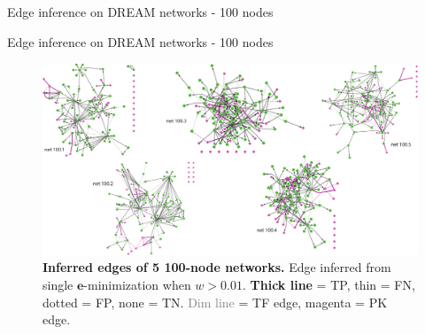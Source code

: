 \begin{frame}{Edge inference on DREAM networks - 100 nodes}
\end{frame}

\begin{frame}{Edge inference on DREAM networks - 100 nodes}
\begin{figure}[ht]
    \centering
    \includegraphics[width=.93\textwidth]{analysis/fig/dream100_infer_pres.pdf}
    \caption{\textbf{Inferred edges of 5 100-node networks.} Edge inferred from single $\boldsymbol{e}$-minimization when $w>0.01$. \textbf{Thick line} = TP, thin = FN, dotted = FP, none = TN. \textcolor{gray}{Dim line} = TF edge, \textcolor{pk!50!magenta}{magenta} = PK edge. }
    \label{fig:dream_100_infer}
\end{figure}
\end{frame}

